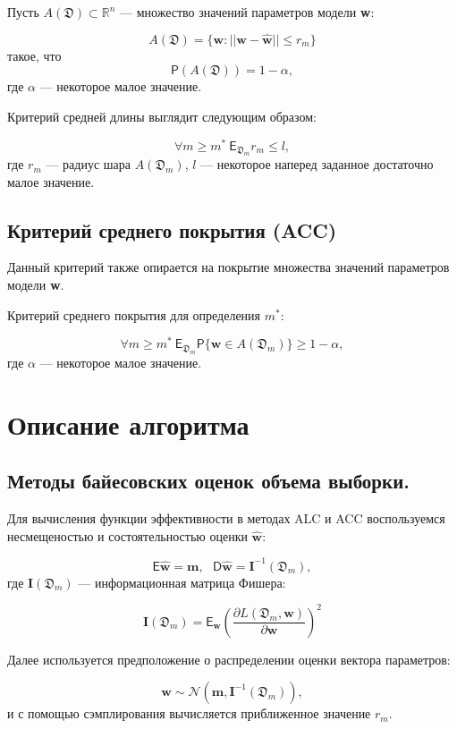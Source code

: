 \documentclass[12pt,twoside]{article}
\begin{document}
Пусть $A(\mathfrak{D}) \subset \mathbb{R}^n$ --- множество значений параметров модели \textbf{w}:

$$
A(\mathfrak{D}) = \{\textbf{w} : ||\textbf{w}- \hat{\textbf{w}}|| \leqslant r_m\}
$$
такое, что
$$
\mathsf{P}(A(\mathfrak{D})) = 1 - \alpha,
$$
где $\alpha$ --- некоторое малое значение. 

Критерий средней длины выглядит следующим образом:

$$
\forall m \geqslant  m^{*}~\mathsf{E}_{\mathfrak D_m} r_m \leqslant l , 
$$
где $r_m$ --- радиус шара $A(\mathfrak{D}_m)$, $l$ --- некоторое наперед заданное достаточно малое значение.

\subsection{Критерий среднего покрытия (ACC)}

Данный критерий также опирается на покрытие множества значений параметров модели \textbf{w}.

Критерий среднего покрытия для определения $m^{*}$:

$$
\forall m \geqslant m^{*}~\mathsf{E}_{\mathfrak D_m} \mathsf{P}\{\textbf{w} \in A(\mathfrak D_m)\} \geqslant 1 - \alpha,
$$
где $\alpha$ --- некоторое малое значение.

\section{Описание алгоритма}

\subsection{Методы байесовских оценок объема выборки.}  Для вычисления функции эффективности в методах ALC и ACC  воспользуемся несмещеностью и состоятельностью оценки $\hat{\textbf{w}}$:

$$
\mathsf{E}\hat{\textbf{w}} = \textbf{m}, ~~~\mathsf{D}\hat{\textbf{w}} = \textbf{I}^{-1}(\mathfrak D_m),
$$
где $\textbf{I}(\mathfrak D_m)$ --- информационная матрица Фишера:

$$
\textbf{I}(\mathfrak D_m) = \mathsf{E}_{\textbf{w}}\left(\frac{\partial L(\mathfrak D_m, \textbf{w})}{\partial \textbf{w}}\right)^2
$$

Далее используется предположение о распределении оценки вектора параметров:

$$
\hat{\textbf{w}} \sim \mathcal{N}(\textbf{m},  \textbf{I}^{-1}(\mathfrak D_m)),
$$
и с помощью сэмплирования вычисляется приближенное значение $r_m$.
\end{document}
